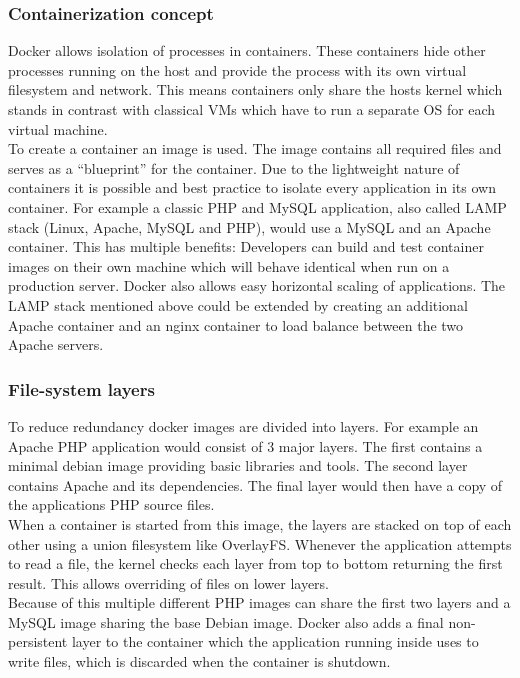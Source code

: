 \documentclass[conference,compsoc,final,a4paper]{IEEEtran}
\begin{document}
\subsubsection*{Containerization concept}
Docker allows isolation of processes in containers. These containers hide other processes running on the host and provide the process with its own virtual filesystem
and network. This means containers only share the hosts kernel which stands in contrast with classical VMs which have to run a separate OS for
each virtual machine. \cite{bernstein2014containers}\\
To create a container an image is used. The image contains all required files and serves as a \enquote{blueprint} for the container. \cite{bernstein2014containers}
Due to the lightweight nature of containers it is possible and best practice to isolate every application in its own container. \cite{dockerBestPractices} For example a
classic PHP and MySQL application, also called LAMP stack (Linux, Apache, MySQL and PHP), would use a MySQL and an Apache container. This has multiple benefits:
Developers can build and test container images on their own machine which will behave identical when run on a production server. Docker also allows easy horizontal
scaling of applications. The LAMP stack mentioned above could be extended by creating an additional Apache container and an nginx container
to load balance between the two Apache servers.
\subsubsection*{File-system layers}
To reduce redundancy docker images are divided into layers. \cite{dockerBestPractices} For example an Apache PHP application would consist of 3
major layers. The first contains a minimal debian image providing basic libraries and tools. The second layer contains Apache and its dependencies. The final
layer would then have a copy of the applications PHP source files. \\
When a container is started from this image, the layers are stacked on top of each other
using a union filesystem like OverlayFS\cite{overlayfs}. Whenever the application attempts to read a file, the kernel checks each layer from top to bottom
returning the first result. This allows overriding of files on lower layers. \\
Because of this multiple different PHP images can share the first two layers and a MySQL image
sharing the base Debian image. Docker also adds a final non-persistent layer to the container which the application running inside uses to write files,
which is discarded when the container is shutdown.
\end{document}
